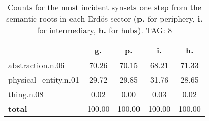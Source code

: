 \begin{table}[h!]
\begin{center}
\begin{tabular}{| l || c | c | c | c |}\hline
 & {\bf g.} & {\bf p.} & {\bf i.} & {\bf h.} \\\hline\hline
abstraction.n.06 & 70.26  & 70.15  & 68.21  & 71.33 \\\hline
physical\_entity.n.01 & 29.72  & 29.85  & 31.76  & 28.65 \\\hline
thing.n.08 & 0.02  & 0.00  & 0.03  & 0.02 \\\hline\hline
{{\bf total}} & 100.00  & 100.00  & 100.00  & 100.00 \\\hline
\end{tabular}
\caption{Counts for the most incident synsets one step from the semantic roots in each Erd\"os sector ({\bf p.} for periphery, {\bf i.} for intermediary, {\bf h.} for hubs). TAG: 8}
\end{center}
\end{table}